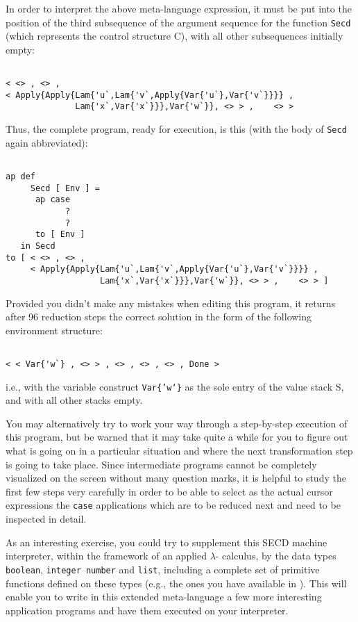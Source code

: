 In order to interpret the above meta-language expression, it must be 
 put into the position of the third subsequence of the argument sequence
for the function {\tt Secd} (which represents the control structure C), with all other subsequences initially empty:
\begin{verbatim}

< <> , <> ,
< Apply{Apply{Lam{'u`,Lam{'v`,Apply{Var{'u`},Var{'v`}}}} ,
              Lam{'x`,Var{'x`}}},Var{'w`}}, <> > ,    <> >

\end{verbatim}
Thus, the complete program, ready for execution, is this (with the
body of {\tt Secd} again abbreviated):
\begin{verbatim}

ap def 
     Secd [ Env ] =
      ap case 
            ?
            ?
      to [ Env ]
   in Secd
to [ < <> , <> ,
     < Apply{Apply{Lam{'u`,Lam{'v`,Apply{Var{'u`},Var{'v`}}}} ,
                   Lam{'x`,Var{'x`}}},Var{'w`}}, <> > ,    <> > ]

\end{verbatim}
Provided you didn't make any mistakes when editing this program,
it returns after 96 reduction steps the correct solution in the form of
the following environment structure:
\begin{verbatim}

< < Var{'w`} , <> > , <> , <> , <> , Done >

\end{verbatim}
i.e., with the variable construct {\tt Var\{'w`\}} as the sole entry
 of the value stack S, and with all other stacks empty.

You may alternatively try to work your way through a step-by-step execution
of this program, but be warned that it may take quite a while for you to
figure out what is going on in a particular situation and where
the next transformation step is going to take place. Since intermediate
programs cannot be completely visualized on the screen without many
 question marks, it is helpful to study the first few steps very carefully
in order to be able to select as the actual cursor expressions the {\tt case}
applications which are to be reduced next and need to be inspected in detail. 

As an interesting exercise, you could try to supplement this SECD
machine interpreter, within the framework of an applied $\lambda$-
calculus, by the data types {\tt boolean}, {\tt integer number}
and {\tt list}, including a complete set of primitive functions
defined on these types (e.g., the ones you have available in \kir).
This will enable you to  write in this extended meta-language a few
more interesting application programs
and have them executed on your interpreter.
